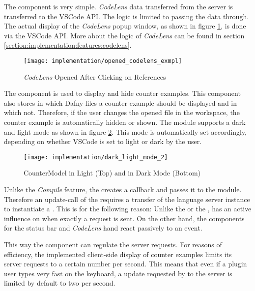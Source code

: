 The  component is very simple. \textit{CodeLens} data transferred from the server is transferred to the VSCode API.
The logic is limited to passing the data through. The actual display of the \textit{CodeLens} popup window,
as shown in figure \ref{fig:opened_codelens_exmpl},
is done via the VSCode API.
More about the logic of \textit{CodeLens} can be found in section \ref{section:implementation:features:codelens}.

\begin{figure}[H]
    \centering
    \texttt{[image: implementation/opened\_codelens\_exmpl]}
    \caption{\textit{CodeLens} Opened After Clicking on References}
    \label{fig:opened_codelens_exmpl}
\end{figure}

The  component is used to display and hide counter examples.
This component also stores in which Dafny files a counter example should be displayed and in which not.
Therefore, if the user changes the opened file in the workspace, the counter example is automatically hidden or shown.
The module supports a dark and light mode as shown in figure \ref{fig:dark_light_mode_2}.
This mode is automatically set accordingly,
depending on whether VSCode is set to light or dark by the user.

\begin{figure}[H]
    \centering
    \texttt{[image: implementation/dark\_light\_mode\_2]}
    \caption{CounterModel in Light (Top) and in Dark Mode (Bottom)}
    \label{fig:dark_light_mode_2}
\end{figure}

Unlike the \textit{Compile} feature, the  creates a callback and passes it to the \linebreak
{} module.
Therefore an update-call of the  requires a transfer of the language server instance to instantiate a .
This is for the following reason: Unlike the  or the ,
 has an active influence on when exactly a request is sent.
On the other hand, the components for the status bar and \textit{CodeLens} hand react passively to an event.

This way the  component can regulate the server requests.
For reasons of efficiency, the implemented client-side display of counter examples limits its
server requests to a certain number per second.
This means that even if a plugin user types very fast on the keyboard, a
update requested by  to the server is limited by default to two per second. \\

